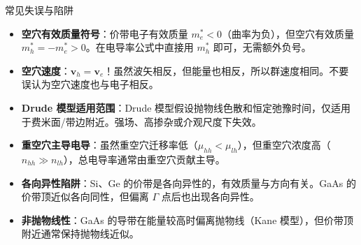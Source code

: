 \begin{errorbox}{常见失误与陷阱}
\begin{itemize}
    \item \textbf{空穴有效质量符号}：价带电子有效质量 $m_e^*<0$（曲率为负），但空穴有效质量 $m_h^*=-m_e^*>0$。在电导率公式中直接用 $m_h^*$ 即可，无需额外负号。
    \item \textbf{空穴速度}：$\mathbf{v}_h=\mathbf{v}_e$！虽然波矢相反，但能量也相反，所以群速度相同。不要误认为空穴速度也与电子相反。
    \item \textbf{Drude 模型适用范围}：Drude 模型假设抛物线色散和恒定弛豫时间，仅适用于费米面/带边附近。强场、高掺杂或介观尺度下失效。
    \item \textbf{重空穴主导电导}：虽然重空穴迁移率低（$\mu_{hh}<\mu_{lh}$），但重空穴浓度高（$n_{hh}\gg n_{lh}$），总电导率通常由重空穴贡献主导。
    \item \textbf{各向异性陷阱}：Si、Ge 的价带是各向异性的，有效质量与方向有关。GaAs 的价带顶近似各向同性，但偏离 $\Gamma$ 点后也出现各向异性。
    \item \textbf{非抛物线性}：GaAs 的导带在能量较高时偏离抛物线（Kane 模型），但价带顶附近通常保持抛物线近似。
\end{itemize}
\end{errorbox}

